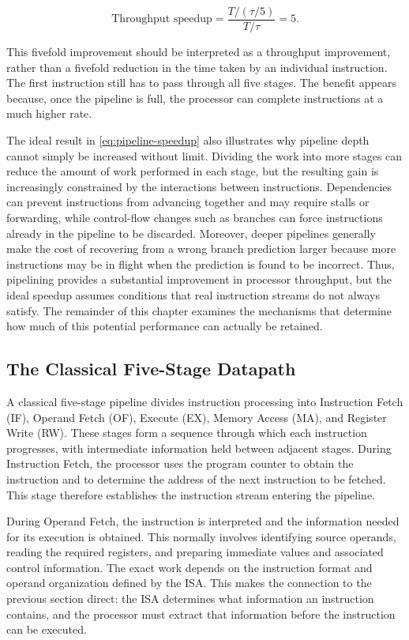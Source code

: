 \documentclass[11pt,a4paper]{report}
\begin{document}
\begin{equation}
\text{Throughput speedup} = \frac{T/(\tau/5)}{T/\tau} = 5.
\label{eq:pipeline-speedup}
\end{equation}

This fivefold improvement should be interpreted as a throughput improvement, rather than a fivefold reduction in the time taken by an individual instruction. The first instruction still has to pass through all five stages. The benefit appears because, once the pipeline is full, the processor can complete instructions at a much higher rate.

The ideal result in \cref{eq:pipeline-speedup} also illustrates why pipeline depth cannot simply be increased without limit. Dividing the work into more stages can reduce the amount of work performed in each stage, but the resulting gain is increasingly constrained by the interactions between instructions. Dependencies can prevent instructions from advancing together and may require stalls or forwarding, while control-flow changes such as branches can force instructions already in the pipeline to be discarded. Moreover, deeper pipelines generally make the cost of recovering from a wrong branch prediction larger because more instructions may be in flight when the prediction is found to be incorrect. Thus, pipelining provides a substantial improvement in processor throughput, but the ideal speedup assumes conditions that real instruction streams do not always satisfy. The remainder of this chapter examines the mechanisms that determine how much of this potential performance can actually be retained.~\cite{sarangi}

\subsection{The Classical Five-Stage Datapath}

A classical five-stage pipeline divides instruction processing into Instruction Fetch (IF), Operand Fetch (OF), Execute (EX), Memory Access (MA), and Register Write (RW). These stages form a sequence through which each instruction progresses, with intermediate information held between adjacent stages. During Instruction Fetch, the processor uses the program counter to obtain the instruction and to determine the address of the next instruction to be fetched. This stage therefore establishes the instruction stream entering the pipeline.

During Operand Fetch, the instruction is interpreted and the information needed for its execution is obtained. This normally involves identifying source operands, reading the required registers, and preparing immediate values and associated control information. The exact work depends on the instruction format and operand organization defined by the ISA. This makes the connection to the previous section direct: the ISA determines what information an instruction contains, and the processor must extract that information before the instruction can be executed.
\end{document}
